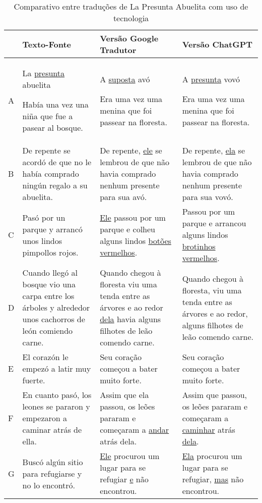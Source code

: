 \documentclass[portuguese]{textolivre}
\begin{document}
\begin{small}
\begin{longtable}{l *{3}{>{\raggedright\arraybackslash}p{4.2cm}}}
\caption{Comparativo entre traduções de La Presunta Abuelita com uso de tecnologia\label{quadro3}} \\
\arrayrulecolor{black}
\toprule
 & Texto-Fonte & Versão Google Tradutor & Versão ChatGPT \\
\midrule
\endfirsthead

\arrayrulecolor{lightgray}
A & La \underline{presunta} abuelita

Había una vez una niña que fue a pasear al bosque. & A \underline{suposta} avó

Era uma vez uma menina que foi passear na floresta. & A \underline{presunta} vovó

Era uma vez uma menina que foi passear na floresta. \\
\hline
B & De repente se acordó de que no le había comprado ningún regalo a su abuelita. & De repente, \underline{ele} se lembrou de que não havia comprado nenhum presente para sua avó. & De repente, \underline{ela} se lembrou de que não havia comprado nenhum presente para sua vovó. \\
\hline
C & Pasó por un parque y arrancó unos lindos pimpollos rojos. & \underline{Ele} passou por um parque e colheu alguns lindos \underline{botões vermelhos}. & Passou por um parque e arrancou alguns lindos \underline{brotinhos vermelhos}. \\
\hline
D & Cuando llegó al bosque vio una carpa entre los árboles y alrededor unos cachorros de león comiendo carne. & Quando chegou à floresta viu uma tenda entre as árvores e ao redor \underline{dela} havia alguns filhotes de leão comendo carne. & Quando chegou à floresta, viu uma tenda entre as árvores e ao redor, alguns filhotes de leão comendo carne. \\
\hline
E & El corazón le empezó a latir muy fuerte. & Seu coração começou a bater muito forte. & Seu coração começou a bater muito forte. \\
\hline
F & En cuanto pasó, los leones se pararon y empezaron a caminar atrás de ella. & Assim que ela passou, os leões pararam e começaram a \underline{andar} atrás dela. & Assim que passou, os leões pararam e começaram a \underline{caminhar} atrás \underline{dela}. \\
\hline
G & Buscó algún sitio para refugiarse y no lo encontró. & \underline{Ele} procurou um lugar para se refugiar \underline{e} não encontrou. & \underline{Ela} procurou um lugar para se refugiar, \underline{mas} não encontrou. \\

\end{longtable}
\end{small}
\end{document}
